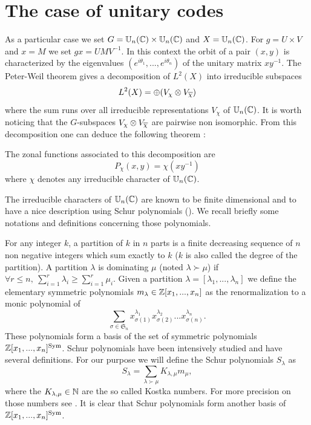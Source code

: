 \documentclass[10pt]{article}
\begin{document}
 \section{The  case of  unitary codes }
  As a particular case we set $G=\mathbb{U}_n(\mathbb{C})\times \mathbb{U}_n(\mathbb{C})$ and $X=\mathbb{U}_n(\mathbb{C})$. For $g=U\times V$ and
  $x=M$ we set $gx=UMV^{-1}$. In this context the orbit of a pair $(x,y)$ is characterized by
  the eigenvalues $(e^{i\theta_1},...,e^{i\theta_n})$ of the unitary matrix $xy^{-1}$. 
  The Peter-Weil theorem gives a decomposition of $L^2(X)$ 
  into irreducible subspaces 
\begin{equation}\label{dec}
L^2(X)=\oplus (V_{\chi}\otimes V_{\overline{\chi}})
\end{equation}
where the sum  runs over all irreducible representations $V_{\chi}$ of
$\mathbb{U}_n(\mathbb{C})$. It is worth noticing that the $G$-subspaces $V_{\chi}\otimes V_{\overline{\chi}}$ are pairwise non isomorphic.  From this decomposition
  one can deduce the following theorem :

  \begin{proposition}
  The zonal functions associated to this decomposition are
\begin{equation*}
 P_\chi(x,y)=\chi(xy^{-1})
\end{equation*}
where $\chi$ denotes any \textrm{ irreducible character of } $\mathbb{U}_n(\mathbb{C})$.
  \end{proposition}

  The irreducible characters of $\mathbb{U}_n(\mathbb{C})$ are known to be finite
  dimensional and to have a nice description using Schur polynomials (\cite{FULTON}). 
 We recall briefly some notations and definitions concerning those polynomials.

 For any integer $k$, a partition of $k$ in $n$ parts is a finite decreasing sequence
 of $n$ non negative integers which sum exactly to $k$ ($k$ is also called the degree
 of the partition). A partition $\lambda$ is dominating $\mu$ (noted $\lambda \succ \mu$)
 if $\forall r\le n,\ \sum_{i=1}^r \lambda_i \ge \sum_{i=1}^r \mu_i$. Given a partition 
 $\lambda=[\lambda_1,...,\lambda_n]$ we define the elementary symmetric polynomials
 $m_\lambda \in \mathbb{Z}[x_1,...,x_n]$ as  the renormalization to a monic polynomial
 of $$\sum_{\sigma \in \mathfrak{S}_n}  x_{\sigma(1)}^{\lambda_1}x_{\sigma(2)}^{\lambda_2}...x_{\sigma(n)}^{\lambda_n}.$$
 These polynomials form a basis of the set of symmetric polynomials $\mathbb{Z}[x_1,...,x_n]^{\textrm {Sym}}$.
 Schur polynomials have been intensively studied and have several definitions. 
 For our purpose we will define the Schur polynomials $S_\lambda$ as 
 $$S_\lambda = \sum_{\lambda \succ \mu} K_{\lambda,\mu} m_\mu,$$
 where the $K_{\lambda,\mu} \in \mathbb{N}$ are the so called Kostka numbers.
 For more precision on those numbers see \cite{SAGAN}.
 It is clear that Schur polynomials form another basis 
 of $\mathbb{Z}[x_1,...,x_n]^{\textrm {Sym}}$.
\end{document}

